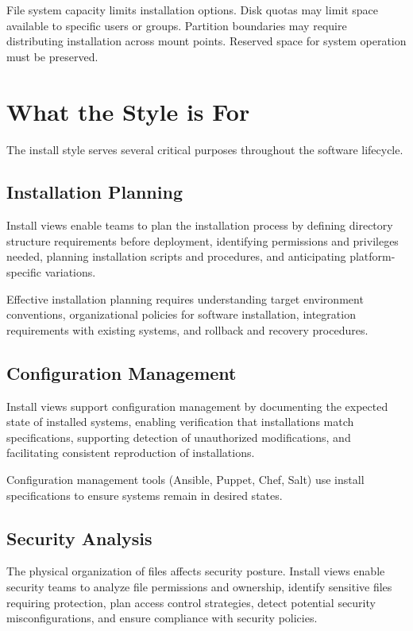 \documentclass[11pt]{article}
\begin{document}
File system capacity limits installation options. Disk quotas may limit space available to specific users or groups. Partition boundaries may require distributing installation across mount points. Reserved space for system operation must be preserved.

\section{What the Style is For}

The install style serves several critical purposes throughout the software lifecycle.

\subsection{Installation Planning}

Install views enable teams to plan the installation process by defining directory structure requirements before deployment, identifying permissions and privileges needed, planning installation scripts and procedures, and anticipating platform-specific variations.

Effective installation planning requires understanding target environment conventions, organizational policies for software installation, integration requirements with existing systems, and rollback and recovery procedures.

\subsection{Configuration Management}

Install views support configuration management by documenting the expected state of installed systems, enabling verification that installations match specifications, supporting detection of unauthorized modifications, and facilitating consistent reproduction of installations.

Configuration management tools (Ansible, Puppet, Chef, Salt) use install specifications to ensure systems remain in desired states.

\subsection{Security Analysis}

The physical organization of files affects security posture. Install views enable security teams to analyze file permissions and ownership, identify sensitive files requiring protection, plan access control strategies, detect potential security misconfigurations, and ensure compliance with security policies.
\end{document}
